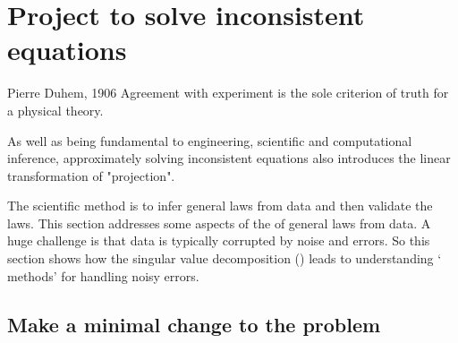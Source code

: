 

\section{Project to solve inconsistent equations}
\label{sec:asie}
\secttoc


\begin{comment}
 \cite[Ch.~7, 12]{Chartier2015}
\end{comment}

\begin{quoted}{Pierre Duhem, 1906}
Agreement with experiment is the sole criterion of truth for a physical theory.
\end{quoted}

\begin{aside}
As well as being fundamental to engineering, scientific and computational inference, approximately solving inconsistent equations also introduces the linear transformation of "projection".
\end{aside}

The scientific method is to infer general laws from data and then validate the laws.
This section addresses some aspects of the  of general laws from data.
A huge challenge is that data is typically corrupted by noise and errors.
So this section shows how the singular value decomposition (\svd) leads to understanding ` methods' for handling noisy errors.



\subsection{Make a minimal change to the problem}
\label{sec:mmctp}

\begin{comment}
This first example introduces a new, linear algebra, view of approximation in a context that relates to students and one they know the answer.  
\end{comment}

